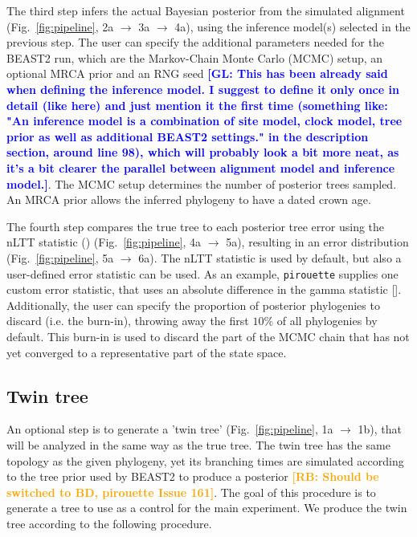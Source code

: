 \documentclass{article}
\newcommand{\giovanni}[1]{\textcolor{blue}{\textbf{[GL: #1]}}}
\newcommand{\richel}[1]{\textcolor{orange}{\textbf{[RB: #1]}}}
\begin{document}
The third step infers the actual Bayesian posterior from the simulated 
alignment (Fig.~\ref{fig:pipeline}, 2a $\rightarrow$ 3a $\rightarrow$ 4a),
using the inference model(s) selected in the previous step. The user
can specify the additional parameters needed for the BEAST2 run, which
are the Markov-Chain Monte Carlo (MCMC) setup, 
an optional MRCA prior and an RNG seed \giovanni{This has been already said when defining the inference model. I suggest to define it only once in detail (like here) and just mention it the first time (something like: "An inference model is a combination of site model, clock model, tree prior as well as additional BEAST2 settings." in the description section, around line 98), which will probably look a bit more neat, as it's a bit clearer the parallel between alignment model and inference model.}.
The MCMC setup determines the number of posterior trees sampled.
An MRCA prior allows the inferred phylogeny to have a dated crown age.

The fourth step compares the true tree to each posterior tree
error using the nLTT statistic (\cite{janzen2015approximate}) 
(Fig.~\ref{fig:pipeline}, 4a $\rightarrow$ 5a), resulting
in an error distribution (Fig.~\ref{fig:pipeline}, 5a $\rightarrow$ 6a).
The nLTT statistic is used by default, but also a user-defined error statistic can be used. As an example,
\verb;pirouette; supplies one custom error statistic,
that uses an absolute difference in the gamma statistic [\cite{pybus2000testing}].
Additionally, the user can specify the
proportion of posterior phylogenies to 
discard (i.e. the burn-in), throwing away the first $10\%$
of all phylogenies by default. This burn-in is used to discard
the part of the MCMC chain that has not yet converged to a
representative part of the state space.

\subsection{Twin tree}

An optional step is to generate a 'twin tree' (Fig.~\ref{fig:pipeline}, 1a $\rightarrow$ 1b),
that will be analyzed in the same way as the true tree.
The twin tree has the same topology as the given phylogeny, 
yet its branching times are simulated according to 
the tree prior used by BEAST2 to produce a posterior 
\richel{Should be switched to BD, pirouette Issue 161}.
The goal of this procedure is to generate a tree 
to use as a control for the main experiment.
We produce the twin tree according to the following procedure.
\end{document}
